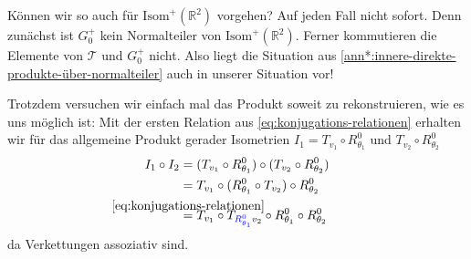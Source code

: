 \documentclass[a4paper, ngerman]{article}
\numberwithin{equation}{chapter}
\theoremstyle{plain}
\theoremstyle{definition}
\newcommand{\geradisometr}{\ensuremath{\mathrm{Isom}^+(\mathbb R^2)}}
\newcommand{\anm}[1]{{\color{red} #1}}
\begin{document}
Können wir so auch für \(\mathrm{Isom}^+(\mathbb R^2)\) vorgehen? Auf jeden Fall nicht sofort. Denn zunächst ist \(G_0^+\) kein Normalteiler von \(\geradisometr\). Ferner kommutieren die Elemente von \(\mathcal T\) und \(G_0^+\) nicht. Also liegt die Situation aus \cref{ann*:innere-direkte-produkte-über-normalteiler} auch in unserer Situation vor!

Trotzdem versuchen wir einfach mal das Produkt soweit zu rekonstruieren, wie es uns möglich ist: Mit der ersten Relation aus \eqref{eq:konjugations-relationen} erhalten wir für das allgemeine Produkt gerader Isometrien \(I_1 = T_{v_1}\circ R_{\theta_1}^0\) und \(T_{v_2}\circ R_{\theta_2}^0\)
\begin{align}
    \begin{split}\label{eq:multiplikation-isomp}
        I_1 \circ I_2 &= (T_{v_1}\circ R_{\theta_1}^0)\circ (T_{v_2}\circ R_{\theta_2}^0) \\
        &= T_{v_1}\circ (R_{\theta_1}^0 \circ T_{v_2})\circ R_{\theta_2}^0 \\
        &\stackrel{\mathclap{\eqref{eq:konjugations-relationen}}}{=} T_{v_1}\circ T_{{\color{blue} R_{\theta_1}^0} v_2} \circ R_{\theta_1}^0 \circ R_{\theta_2}^0
    \end{split}
\end{align}
da Verkettungen assoziativ sind. 
\end{document}
